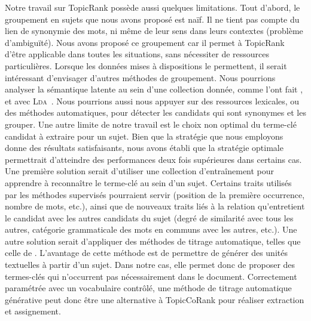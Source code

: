     Notre travail sur TopicRank possède aussi quelques limitations. Tout
    d'abord, le groupement en sujets que nous avons proposé est naïf. Il ne
    tient pas compte du lien de synonymie des mots, ni même de leur sens dans
    leurs contextes (problème d'ambiguïté). Nous avons proposé ce groupement car
    il permet à TopicRank d'être applicable dans toutes les situations, sans
    nécessiter de ressources particulières. Lorsque les données mises à
    dispositions le permettent, il serait intéressant d'envisager d'autres
    méthodes de groupement. Nous pourrions analyser la sémantique latente au
    sein d'une collection donnée, comme l'ont fait
    , 
    et  avec
    \textsc{Lda}~\cite{blei2003lda}. Nous pourrions aussi nous appuyer sur des
    ressources lexicales, ou des méthodes automatiques, pour détecter les
    candidats qui sont synonymes et les grouper. Une autre limite de notre
    travail est le choix non optimal du terme-clé candidat à extraire pour un
    sujet. Bien que la stratégie que nous employons donne des résultats
    satisfaisants, nous avons établi que la stratégie optimale permettrait
    d'atteindre des performances deux fois supérieures dans certains cas. Une
    première solution serait d'utiliser une collection d'entraînement pour
    apprendre à reconnaître le terme-clé au sein d'un sujet. Certains traits
    utilisés par les méthodes supervisés pourraient servir (position de la
    première occurrence, nombre de mots, etc.), ainsi que de nouveaux traits
    liés à la relation qu'entretient le candidat avec les autres candidats du
    sujet (degré de similarité avec tous les autres, catégorie grammaticale des
    mots en communs avec les autres, etc.). Une autre solution serait
    d'appliquer des méthodes de titrage automatique, telles que celle de
    . L'avantage de cette méthode est de
    permettre de générer des unités textuelles à partir d'un sujet. Dans notre
    cas, elle permet donc de proposer des termes-clés qui n'occurrent pas
    nécessairement dans le document. Correctement paramétrée avec un vocabulaire
    contrôlé, une méthode de titrage automatique générative peut donc être une
    alternative à TopicCoRank pour réaliser extraction et assignement.

